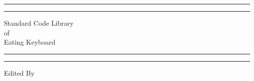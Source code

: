\documentclass[UTF8]{ctexart}
\begin{document}
\newpage
\begin{titlepage} %

	\centering %

	\scshape %

	\vspace*{\baselineskip} %


	\rule{\textwidth}{1.6pt}\vspace*{-\baselineskip}\vspace*{2pt} %

	\rule{\textwidth}{0.4pt} %

	\vspace{0.75\baselineskip} %

	{\LARGE Standard Code Library\\ of\\ Eating Keyboard\\} %

	\vspace{0.75\baselineskip} %

	\rule{\textwidth}{0.4pt}\vspace*{-\baselineskip}\vspace{3.2pt} %

	\rule{\textwidth}{1.6pt} %

	\vspace{2\baselineskip} %



	\vspace*{3\baselineskip} %


	Edited By

	\vspace{0.5\baselineskip} %


\end{titlepage}
\end{document}
